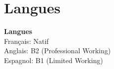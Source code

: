 \section{Langues}


\begin{minipage}[t]{0.45\textwidth}
    \textbf{Langues}\\
    \icon{\faFlag} Français: Natif\\
    \icon{\faComment} Anglais: B2 (Professional Working)\\
    \icon{\faComment} Espagnol: B1 (Limited Working)
\end{minipage}
